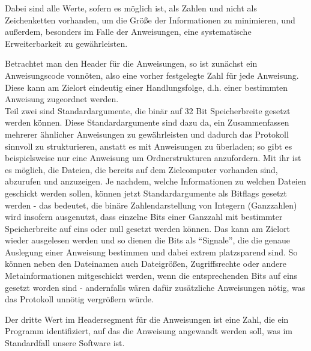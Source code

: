 Dabei sind alle Werte, sofern es möglich ist, als Zahlen und nicht als Zeichenketten vorhanden, um die Größe der Informationen zu minimieren, und außerdem, besonders im Falle der Anweisungen, eine systematische Erweiterbarkeit zu gewährleisten.\\\par
Betrachtet man den Header für die Anweisungen, so ist zunächst ein Anweisungscode vonnöten, also eine vorher festgelegte Zahl für jede Anweisung.
Diese kann am Zielort eindeutig einer Handlungsfolge, d.h. einer bestimmten Anweisung zugeordnet werden.\\
Teil zwei sind Standardargumente, die binär auf 32 Bit Speicherbreite gesetzt werden können.
Diese Standardargumente sind dazu da, ein Zusammenfassen mehrerer ähnlicher Anweisungen zu gewährleisten und dadurch das Protokoll sinnvoll zu strukturieren, anstatt es mit Anweisungen zu überladen; so gibt es beispielsweise nur eine Anweisung um Ordnerstrukturen anzufordern.  
Mit ihr ist es möglich, die Dateien, die bereits auf dem Zielcomputer vorhanden sind, abzurufen und anzuzeigen. 
Je nachdem, welche Informationen zu welchen Dateien geschickt werden sollen, können jetzt Standardargumente als Bitflags gesetzt werden -  das bedeutet, die binäre Zahlendarstellung von Integern (Ganzzahlen) wird insofern ausgenutzt, dass einzelne Bits einer Ganzzahl mit bestimmter Speicherbreite auf eins oder null gesetzt werden können. Das kann am Zielort wieder ausgelesen werden und so dienen die Bits als "`Signale"', die die genaue Auslegung einer Anweisung bestimmen und dabei extrem platzsparend sind.
So können neben den Datei\-namen auch Dateigrößen, Zugriffsrechte oder andere Metainformationen mitgeschickt werden, wenn die entsprechenden Bits auf eins gesetzt worden sind - andernfalls wären dafür zusätzliche Anweisungen nötig, was das Protokoll unnötig vergrößern würde.\par
Der dritte Wert im Headersegment für die Anweisungen ist eine Zahl, die ein Programm identifiziert, auf das die Anweisung angewandt werden soll, was im Standardfall unsere Software ist.

